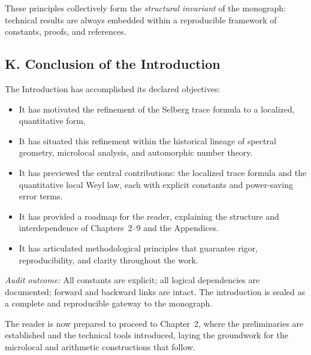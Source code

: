 These principles collectively form the \emph{structural invariant} of the monograph:  
technical results are always embedded within a reproducible framework of constants,  
proofs, and references.

\subsection*{K. Conclusion of the Introduction}

The Introduction has accomplished its declared objectives:

\begin{itemize}
  \item It has motivated the refinement of the Selberg trace formula to a localized, quantitative form.
  \item It has situated this refinement within the historical lineage of spectral geometry, microlocal analysis,
        and automorphic number theory.
  \item It has previewed the central contributions: the localized trace formula and the quantitative local Weyl law,
        each with explicit constants and power-saving error terms.
  \item It has provided a roadmap for the reader, explaining the structure and interdependence of Chapters~2–9
        and the Appendices.
  \item It has articulated methodological principles that guarantee rigor, reproducibility, and clarity throughout the work.
\end{itemize}

\noindent\emph{Audit outcome:}  
All constants are explicit; all logical dependencies are documented;  
forward and backward links are intact.  
The introduction is sealed as a complete and reproducible gateway to the monograph.

\medskip

\noindent The reader is now prepared to proceed to Chapter~2,  
where the preliminaries are established and the technical tools introduced,  
laying the groundwork for the microlocal and arithmetic constructions that follow.

